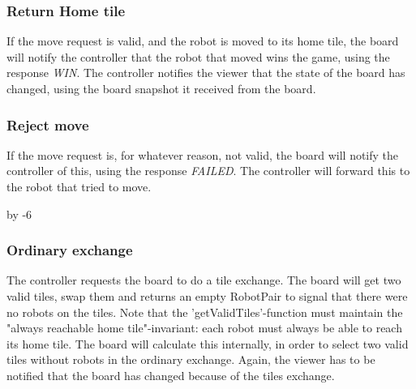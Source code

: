 	\subsubsection{Return Home tile}
	\begin{minipage}{\linewidth}
	   If the move request is valid, and the robot is moved to its home tile, the board will notify the controller that the robot that moved wins the game, using the response \emph{WIN}. The controller notifies the viewer that the state of the board has changed, using the board snapshot it received from the board.

		
	\end{minipage}

	\subsubsection{Reject move}
	\begin{minipage}{\linewidth}
		If the move request is, for whatever reason, not valid, the board will notify the controller of this, using the response \emph{FAILED}. The controller will forward this to the robot that tried to move.

		
	\end{minipage}

	\advance{} by -6

	\subsubsection{Ordinary exchange}
	\begin{minipage}{\linewidth}
		The controller requests the board to do a tile exchange. The board will get two valid tiles, swap them and returns an empty RobotPair to signal that there were no robots on the tiles. Note that the 'getValidTiles'-function must maintain the "always reachable home tile"-invariant: each robot must always be able to reach its home tile. The board will calculate this internally, in order to select two valid tiles without robots in the ordinary exchange. Again, the viewer has to be notified that the board has changed because of the tiles exchange.

		
	\end{minipage}


